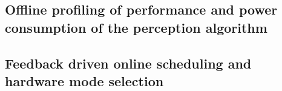 \subsection{Offline profiling of performance and power consumption of the perception algorithm}
\label{sec:profiling}


\subsection{Feedback driven online scheduling and hardware mode selection}
\label{sec:scheduling}

